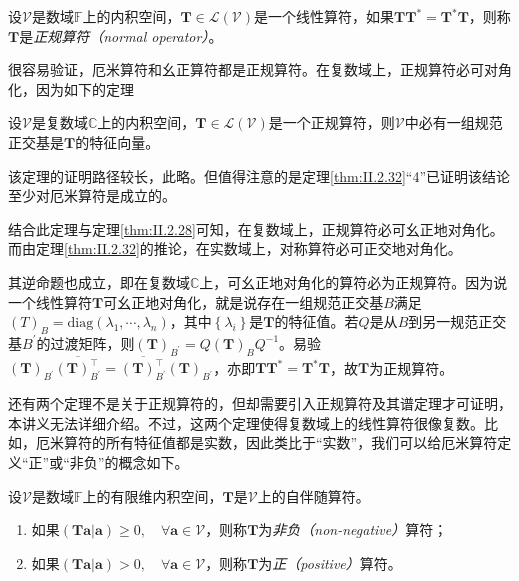 \documentclass[main.tex]{subfiles}
\begin{document}
\begin{definition}[正规算符]\label{def:II.2.24}
    设$\mathcal{V}$是数域$\mathbb{F}$上的内积空间，$\mathbf{T}\in\mathcal{L}\left(\mathcal{V}\right)$是一个线性算符，如果$\mathbf{TT}^*=\mathbf{T}^*\mathbf{T}$，则称$\mathbf{T}$是\emph{正规算符（normal operator）}。
\end{definition}

很容易验证，厄米算符和幺正算符都是正规算符。在复数域上，正规算符必可对角化，因为如下的定理

\begin{theorem}\label{thm:II.2.35}
    设$\mathcal{V}$是复数域$\mathbb{C}$上的内积空间，$\mathbf{T}\in\mathcal{L}\left(\mathcal{V}\right)$是一个正规算符，则$\mathcal{V}$中必有一组规范正交基是$\mathbf{T}$的特征向量。
\end{theorem}

该定理的证明路径较长，此略\cite[\S 8.5 Theorem 22]{Hoffman1971}。但值得注意的是定理\ref{thm:II.2.32}“4”已证明该结论至少对厄米算符是成立的。

结合此定理与定理\ref{thm:II.2.28}可知，在复数域上，正规算符必可幺正地对角化。而由定理\ref{thm:II.2.32}的推论，在实数域上，对称算符必可正交地对角化。

其逆命题也成立，即在复数域$\mathbb{C}$上，可幺正地对角化的算符必为正规算符。因为说一个线性算符$\mathbf{T}$可幺正地对角化，就是说存在一组规范正交基$B$满足$\left(T\right)_B=\mathrm{diag}\left(\lambda_1,\cdots,\lambda_n\right)$，其中$\left\{\lambda_i\right\}$是$\mathbf{T}$的特征值。若$Q$是从$B$到另一规范正交基$B^\prime$的过渡矩阵，则$\left(\mathbf{T}\right)_{B^\prime}=Q\left(\mathbf{T}\right)_{B}Q^{-1}$。易验$\left(\mathbf{T}\right)_{B^\prime}\overline{\left(\mathbf{T}\right)^\intercal_{B^\prime}}=\overline{\left(\mathbf{T}\right)^\intercal_{B^\prime}}\left(\mathbf{T}\right)_{B^\prime}$，亦即$\mathbf{TT}^*=\mathbf{T}^*\mathbf{T}$，故$\mathbf{T}$为正规算符。

还有两个定理不是关于正规算符的，但却需要引入正规算符及其谱定理才可证明，本讲义无法详细介绍。不过，这两个定理使得复数域上的线性算符很像复数。比如，厄米算符的所有特征值都是实数，因此类比于“实数”，我们可以给厄米算符定义“正”或“非负”的概念如下。

\begin{definition}\label{def:II.2.25}
    设$\mathcal{V}$是数域$\mathbb{F}$上的有限维内积空间，$\mathbf{T}$是$\mathcal{V}$上的自伴随算符。
    \begin{enumerate}
        \item 如果$\left(\mathbf{Ta}|\mathbf{a}\right)\geq 0,\quad\forall\mathbf{a}\in\mathcal{V}$，则称$\mathbf{T}$为\emph{非负（non-negative）}算符；
        \item 如果$\left(\mathbf{Ta}|\mathbf{a}\right)> 0,\quad\forall\mathbf{a}\in\mathcal{V}$，则称$\mathbf{T}$为\emph{正（positive）}算符。
    \end{enumerate}
\end{definition}
\end{document}
